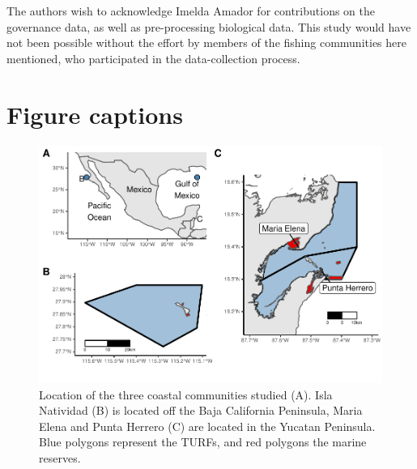 \documentclass{frontiersSCNS}
\theoremstyle{definition}
\theoremstyle{definition}
\theoremstyle{definition}
\theoremstyle{remark}
\begin{document}
The authors wish to acknowledge Imelda Amador for contributions on the
governance data, as well as pre-processing biological data. This study
would have not been possible without the effort by members of the
fishing communities here mentioned, who participated in the
data-collection process.

\clearpage



\clearpage

\section*{Figure captions}

\begin{figure}
\centering
\includegraphics{Villasenor-Derbez_files/figure-latex/unnamed-chunk-7-1.pdf}
\caption{\label{fig:unnamed-chunk-7}\label{fig:map}Location of the three
coastal communities studied (A). Isla Natividad (B) is located off the
Baja California Peninsula, Maria Elena and Punta Herrero (C) are located
in the Yucatan Peninsula. Blue polygons represent the TURFs, and red
polygons the marine reserves.}
\end{figure}
\end{document}
